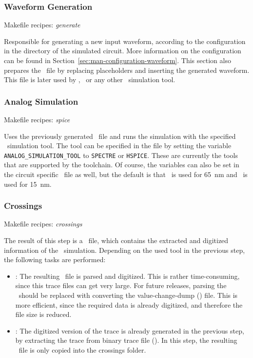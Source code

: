 \subsubsection{Waveform Generation}
\label{sec:man-work-waveform-generation}

Makefile recipes: \emph{generate}

Responsible for generating a new input waveform, according to the
configuration in the directory of the simulated circuit. More
information on the configuration can be found in Section~\ref{sec:man-configuration-waveform}. This section also prepares the
\spfile\ file by replacing placeholders and inserting the generated waveform. 
This 
file is later used by \hspice, \spectre\ or any other \spice\ simulation tool.

\subsubsection{Analog Simulation}
\label{sec:man-work-waveform-analog-simulation}

Makefile recipes: \emph{spice}

Uses the previously generated \spfile\ file and runs the simulation with the 
specified \spice\ simulation tool. The tool can be specified in the 
 file by setting the variable 
\lstinline|ANALOG_SIMULATION_TOOL| to \lstinline|SPECTRE| or 
\lstinline|HSPICE|. These are currently the tools that are supported by the 
toolchain. Of course, the variables can also be set in the circuit specific 
\configcfg\ file as well, but the default is that \hspice\ is used for 
\SI{65}{\nm} and \spectre\ is used for \SI{15}{\nm}.

\subsubsection{Crossings}
\label{sec:man-work-waveform-crossings}

Makefile recipes: \emph{crossings}

The result of this step is a \crossingsjson\ file, which contains the extracted 
and digitized information of the \spice\ simulation. Depending on the used tool 
in the previous step, the following tasks are performed:
\begin{itemize}
	\item \hspice: The resulting \trfile\ file is parsed and digitized. This is 
	rather time-consuming, since this trace files can get very large. For 
	future releases, parsing the \trfile\ should be replaced with converting 
	the value-change-dump (\vcdfile) file. This is more efficient, since the 
	required data is already digitized, and therefore the file size is reduced.
	\item \spectre: The digitized version of the trace is already generated in 
	the previous step, by extracting the trace from binary trace file 
	(\rawfile). 
	In this step, the resulting \jsonfile\ file is only copied into the 
	crossings 
	folder.
\end{itemize}

